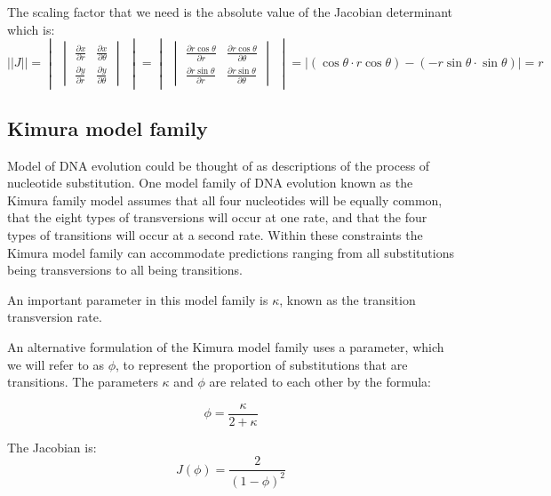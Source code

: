 \documentclass[man]{apa}
\begin{document}
The scaling factor that we need is the absolute value of the Jacobian determinant which is:
   \[||J||= \begin{vmatrix} \begin{vmatrix}
   \frac{\partial x}{\partial r}&\frac{\partial x}{\partial \theta}\\
   \frac{\partial y}{\partial r}&\frac{\partial y}{\partial \theta}
    \end{vmatrix} \end{vmatrix} = \begin{vmatrix} \begin{vmatrix}
   \frac{\partial r \cos \theta}{\partial r}&\frac{\partial r \cos \theta}{\partial \theta}\\
   \frac{\partial r \sin \theta}{\partial r}&\frac{\partial r \sin \theta}{\partial \theta}
    \end{vmatrix} \end{vmatrix} =
    \left|\left(\cos \theta \cdot r \cos \theta \right)-\left(- r \sin \theta \cdot \sin \theta \right)\right|=r
   \]

\subsection*{Kimura model family}

Model of DNA evolution could be thought of as descriptions of the process of nucleotide substitution. One model family of DNA evolution known as the Kimura family model assumes that  all four nucleotides will be equally common, that the eight types of transversions will occur at one rate, and that the four types of transitions will occur at a second rate. Within these constraints the Kimura model family can accommodate predictions ranging from all substitutions being transversions to all being transitions.

An important parameter in this model family is $\kappa$, known as the transition transversion rate.

An alternative formulation of the Kimura model family
uses a parameter, which we will refer to as $\phi$, to represent the proportion of substitutions that are transitions. The parameters $\kappa$ and $\phi$ are related to each other by the
formula:

$$\phi = \frac{\kappa}{2 + \kappa}$$


The Jacobian is:
   \[J(\phi) = \frac{2}{(1 - \phi)^2}
   \]
\end{document}

